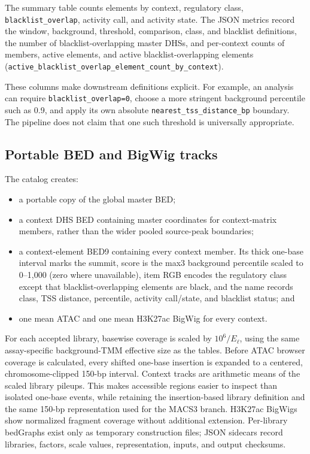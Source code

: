 \documentclass[11pt]{article}
\begin{document}
The summary table counts elements by context, regulatory class,
\texttt{blacklist\_overlap}, activity call, and activity state.  The JSON
metrics record the window, background, threshold, comparison, class, and
blacklist definitions, the number of blacklist-overlapping master DHSs, and
per-context counts of members, active elements, and active blacklist-overlapping
elements (\texttt{active\_blacklist\_overlap\_element\_count\_by\_context}).

These columns make downstream definitions explicit.  For example, an analysis
can require \texttt{blacklist\_overlap=0}, choose a more stringent background
percentile such as 0.9, and apply its own absolute
\texttt{nearest\_tss\_distance\_bp} boundary.  The pipeline does not claim that
one such threshold is universally appropriate.

\subsection{Portable BED and BigWig tracks}

The catalog creates:

\begin{itemize}
  \item a portable copy of the global master BED;
  \item a context DHS BED containing master coordinates for context-matrix
  members, rather than the wider pooled source-peak boundaries;
  \item a context-element BED9 containing every context member.  Its thick
  one-base interval marks the summit, score is the max3 background percentile
  scaled to 0--1,000 (zero where unavailable), item RGB encodes the
  regulatory class except that blacklist-overlapping elements are black, and
  the name records class, TSS distance, percentile, activity call/state, and
  blacklist status; and
  \item one mean ATAC and one mean H3K27ac BigWig for every context.
\end{itemize}

For each accepted library, basewise coverage is scaled by
\(10^6/E_{\ell}\), using the same assay-specific background-TMM effective size
as the tables.  Before ATAC browser coverage is calculated, every shifted
one-base insertion is expanded to a centered, chromosome-clipped 150-bp
interval.  Context tracks are arithmetic means of the scaled library pileups.
This makes accessible regions easier to inspect than isolated one-base events,
while retaining the insertion-based library definition and the same 150-bp
representation used for the MACS3 branch.  H3K27ac BigWigs show normalized
fragment coverage without additional extension.  Per-library bedGraphs exist
only as temporary construction files; JSON sidecars record libraries, factors,
scale values, representation, inputs, and output checksums.
\end{document}
